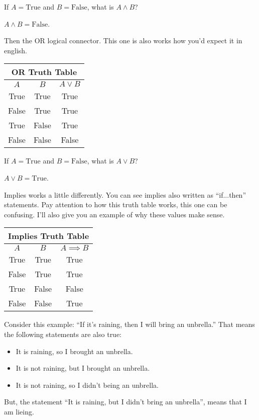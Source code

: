 \begin{boxexample}{}{}
	If $A=\text{True}$ and $B=\text{False}$, what is $A \land B$?
	
	$A \land B = \text{False}$.
\end{boxexample}

Then the OR logical connector. This one is also works how you'd expect it in english.

\medskip
\begin{tabular}{c|c|c}
	\hline
	\multicolumn{3}{c}{OR Truth Table}\\
	\hline
	$A$ & $B$ & $A \lor B$\\
	\hline
	True & True & True\\
	False & True & True\\
	True & False & True\\
	False & False & False\\
	\hline
\end{tabular}
\medskip

\begin{boxexample}{}{}
	If $A=\text{True}$ and $B=\text{False}$, what is $A \lor B$?
	
	$A \lor B = \text{True}$.
\end{boxexample}

Implies works a little differently. You can see implies also written as ``if...then'' statements. Pay attention to how this truth table works, this one can be confusing. I'll also give you an example of why these values make sense.

\medskip
\begin{tabular}{c|c|c}
	\hline
	\multicolumn{3}{c}{Implies Truth Table}\\
	\hline
	$A$ & $B$ & $A \implies B$\\
	\hline
	True & True & True\\
	False & True & True\\
	True & False & False\\
	False & False & True\\
	\hline
\end{tabular}
\medskip

\begin{boxexample}{}{}
	Consider this example: ``If it's raining, then I will bring an unbrella.'' That means the following statements are also true:
	\begin{itemize}
		\item It is raining, so I brought an unbrella.
		\item It is not raining, but I brought an unbrella.
		\item It is not raining, so I didn't being an unbrella.
	\end{itemize}
	But, the statement ``It is raining, but I didn't bring an unbrella'', means that I am lieing.
\end{boxexample}

